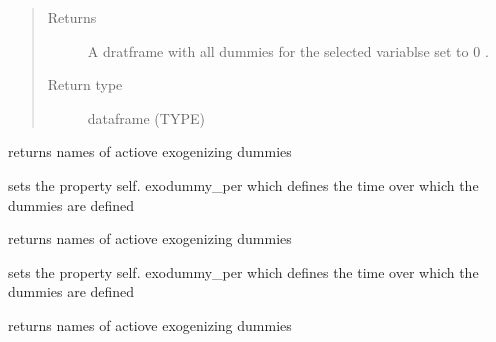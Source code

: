 \documentclass[letterpaper,10pt,english]{sphinxmanual}
\begin{document}
\begin{fulllineitems}
\begin{fulllineitems}
\begin{quote}
\begin{description}
\begin{itemize}
\end{itemize}

\item[{Returns}] \leavevmode
\sphinxAtStartPar
A dratframe with all dummies for the selected variablse set to 0 .

\item[{Return type}] \leavevmode
\sphinxAtStartPar
dataframe (TYPE)

\end{description}\end{quote}

\end{fulllineitems}


\begin{fulllineitems}
\label{\detokenize{index:modelclass.WB_Mixin.find_fix_dummy_fixed}}
\pysigstartsignatures
{}
\pysigstopsignatures
\sphinxAtStartPar
returns names of actiove exogenizing dummies

\sphinxAtStartPar
sets the property self. exodummy\_per which defines the time over which the dummies are defined

\end{fulllineitems}


\begin{fulllineitems}
\label{\detokenize{index:modelclass.WB_Mixin.fix_dummy_fixed}}
\pysigstartsignatures
{}
\pysigstopsignatures
\sphinxAtStartPar
returns names of actiove exogenizing dummies

\sphinxAtStartPar
sets the property self. exodummy\_per which defines the time over which the dummies are defined

\end{fulllineitems}


\begin{fulllineitems}
\label{\detokenize{index:modelclass.WB_Mixin.fix_dummy_fixed_old}}
\pysigstartsignatures
{}
\pysigstopsignatures
\sphinxAtStartPar
returns names of actiove exogenizing dummies


\end{fulllineitems}
\end{fulllineitems}
\end{document}
